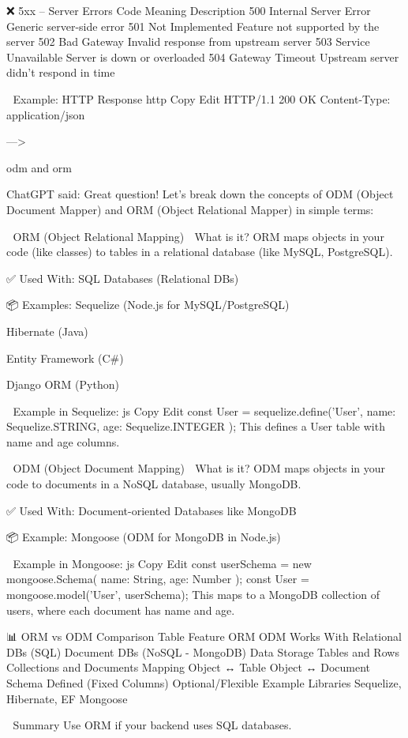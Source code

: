 ❌ 5xx – Server Errors
Code	Meaning	Description
500	Internal Server Error	Generic server-side error
501	Not Implemented	Feature not supported by the server
502	Bad Gateway	Invalid response from upstream server
503	Service Unavailable	Server is down or overloaded
504	Gateway Timeout	Upstream server didn't respond in time

🧾 Example: HTTP Response
http
Copy
Edit
HTTP/1.1 200 OK
Content-Type: application/json


--->


odm and orm


ChatGPT said:
Great question! Let’s break down the concepts of ODM (Object Document Mapper) and ORM (Object Relational Mapper) in simple terms:

📘 ORM (Object Relational Mapping)
🔹 What is it?
ORM maps objects in your code (like classes) to tables in a relational database (like MySQL, PostgreSQL).

✅ Used With:
SQL Databases (Relational DBs)

📦 Examples:
Sequelize (Node.js for MySQL/PostgreSQL)

Hibernate (Java)

Entity Framework (C#)

Django ORM (Python)

🧾 Example in Sequelize:
js
Copy
Edit
const User = sequelize.define('User', {
  name: Sequelize.STRING,
  age: Sequelize.INTEGER
});
This defines a User table with name and age columns.

📙 ODM (Object Document Mapping)
🔹 What is it?
ODM maps objects in your code to documents in a NoSQL database, usually MongoDB.

✅ Used With:
Document-oriented Databases like MongoDB

📦 Example:
Mongoose (ODM for MongoDB in Node.js)

🧾 Example in Mongoose:
js
Copy
Edit
const userSchema = new mongoose.Schema({
  name: String,
  age: Number
});
const User = mongoose.model('User', userSchema);
This maps to a MongoDB collection of users, where each document has name and age.

📊 ORM vs ODM Comparison Table
Feature	ORM	ODM
Works With	Relational DBs (SQL)	Document DBs (NoSQL - MongoDB)
Data Storage	Tables and Rows	Collections and Documents
Mapping	Object ↔ Table	Object ↔ Document
Schema	Defined (Fixed Columns)	Optional/Flexible
Example Libraries	Sequelize, Hibernate, EF	Mongoose

🧠 Summary
Use ORM if your backend uses SQL databases.

